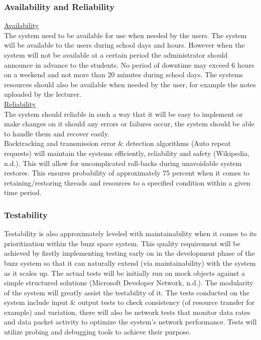 \subsubsection{Availability and Reliability}

\underline{Availability}\\

The system need to be available for use when needed by the users. The system will be available to the users during school days and hours. However when the system will not be available at a certain period the administrator should announce in advance to the students. No period of downtime may exceed 6 hours on a weekend and not more than 20 minutes during school days. The systems resources should also be available when needed by the user, for example the notes uploaded by the lecturer. \\


\underline{Reliability}\\
The system should reliable in such a way that it will be easy to implement or make changes on it should any errors or failures occur, the system should be able to handle them and recover easily.\\

Backtracking and transmission error \& detection algorithms (Auto repeat requests) will maintain the systems efficiently, reliability and safety (Wikipedia, n.d.). This will allow for uncomplicated roll-backs during unavoidable system restores. This ensures probability of approximately 75 percent when it comes to retaining/restoring threads and resources to a specified condition within a given time period.\\

\subsubsection{Testability}

Testability is also approximately leveled with maintainability when it comes to its prioritization within the buzz space system. This quality requirement will be achieved by firstly implementing testing early on in the development phase of the buzz system so that it can naturally extend (via maintainability) with the system as it scales up. The actual tests will be initially run on mock objects against a simple structured solutions (Microsoft Developer Network, n.d.). The modularity of the system will greatly assist the testability of it. The tests conducted on the system include input \& output tests to check consistency (of resource transfer for example) and variation, there will also be network tests that monitor data rates and data packet activity to optimize the system’s network performance. Tests will utilize probing and debugging tools to achieve their purpose.\\



